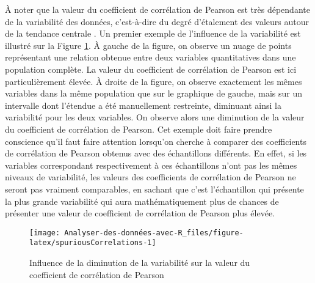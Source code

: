 \documentclass[
  french,
]{book}
\begin{document}
À noter que la valeur du coefficient de corrélation de Pearson est très dépendante de la variabilité des données, c'est-à-dire du degré d'étalement des valeurs autour de la tendance centrale \autocite{halperinSpuriousCorrelationsCauses1986}. Un premier exemple de l'influence de la variabilité est illustré sur la Figure \ref{fig:spuriousCorrelations}. À gauche de la figure, on observe un nuage de points représentant une relation obtenue entre deux variables quantitatives dans une population complète. La valeur du coefficient de corrélation de Pearson est ici particulièrement élevée. À droite de la figure, on observe exactement les mêmes variables dans la même population que sur le graphique de gauche, mais sur un intervalle dont l'étendue a été manuellement restreinte, diminuant ainsi la variabilité pour les deux variables. On observe alors une diminution de la valeur du coefficient de corrélation de Pearson. Cet exemple doit faire prendre conscience qu'il faut faire attention lorsqu'on cherche à comparer des coefficients de corrélation de Pearson obtenus avec des échantillons différents. En effet, si les variables correspondant respectivement à ces échantillons n'ont pas les mêmes niveaux de variabilité, les valeurs des coefficients de corrélation de Pearson ne seront pas vraiment comparables, en sachant que c'est l'échantillon qui présente la plus grande variabilité qui aura mathématiquement plus de chances de présenter une valeur de coefficient de corrélation de Pearson plus élevée.

\begin{figure}

{\centering \texttt{[image: Analyser-des-données-avec-R\_files/figure-latex/spuriousCorrelations-1]} 

}

\caption{Influence de la diminution de la variabilité sur la valeur du coefficient de corrélation de Pearson}\label{fig:spuriousCorrelations}
\end{figure}
\end{document}
